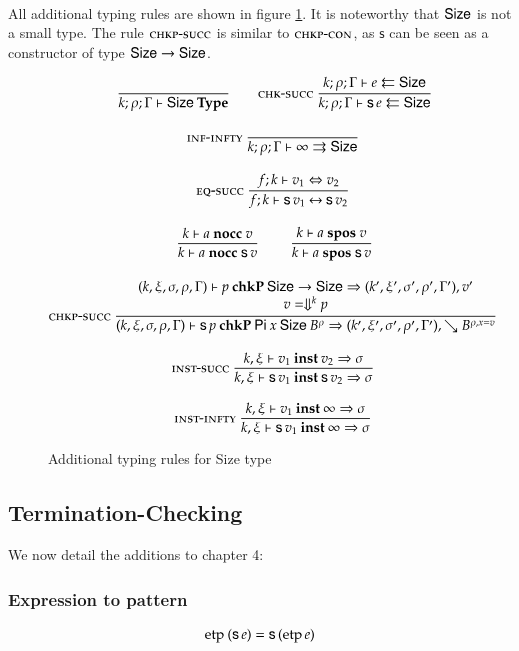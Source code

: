\paragraph*{}
\noindent All additional typing rules are shown in figure \ref{fadd}.
It is noteworthy that $\mathsf{Size}$ is not a small type.
The rule $\mbox{\sc chkp-succ}$ is similar to $\mbox{\sc chkp-con}$, as $\mathsf{s}$ can be seen as a constructor of type $\mathsf{Size} \rightarrow \mathsf{Size}$.
\begin{figure}[htp]
\begin{gather*}
\ \dfrac{}{k;\rho;\Gamma\vdash\mathsf{Size}\:\mathbf{Type}}
\qquad
\mbox{\sc chk-succ}\ \dfrac{k;\rho;\Gamma\vdash e\leftleftarrows\mathsf{Size}}{k;\rho;\Gamma\vdash\mathsf{s}\, e\leftleftarrows\mathsf{Size}} 
\\[2ex]
\mbox{\sc inf-infty}\ \dfrac{}{k;\rho;\Gamma\vdash\infty\rightrightarrows\mathsf{Size}} 
\\[2ex]
\mbox{\sc eq-succ}\ \dfrac{f;k\vdash v_1\Leftrightarrow v_2}{f;k\vdash\mathsf{s}\, v_1{\:\leftrightarrow\:}\mathsf{s}\, v_2}
\\[2ex]
\ \dfrac{k\vdash a\mbox{ \textbf{nocc} }v}{k\vdash a\mbox{ \textbf{nocc} }\mathsf{s}\, v}
\qquad
\ \dfrac{k\vdash a\mbox{ \textbf{spos} }v}{k\vdash a\mbox{ \textbf{spos} }\mathsf{s}\, v}
\\[2ex]
\mbox{\sc chkp-succ}\ \dfrac{\begin{array}[b]{c}
(k,\xi,\sigma,\rho,\Gamma)\vdash p\:\mathbf{chkP}\:\mathsf{Size} \rightarrow \mathsf{Size}\Rightarrow (k',\xi',\sigma',\rho',\Gamma'),v'\\v = \Downarrow^{k}p \end{array}}{
(k,\xi,\sigma,\rho,\Gamma)\vdash\mathsf{s}\, p\:\mathbf{chkP}\:\mathsf{Pi} \: x \: \mathsf{Size} \: B^{\rho}\Rightarrow (k',\xi',\sigma',\rho',\Gamma'),\searrow B^{\rho,x=v}}
\\[2ex]
\mbox{\sc inst-succ}\ \dfrac{k,\xi\vdash v_1\:\mathbf{inst}\:v_2\Rightarrow \sigma}{k,\xi\vdash\mathsf{s}\, v_1\:\mathbf{inst}\:\mathsf{s}\, v_2\Rightarrow \sigma
}
\\[2ex]
\mbox{\sc inst-infty}\ \dfrac{k,\xi\vdash v_1\:\mathbf{inst}\:\infty\Rightarrow \sigma}{k,\xi\vdash\mathsf{s}\, v_1\:\mathbf{inst}\:\infty\Rightarrow \sigma
}
\end{gather*}
\caption{Additional typing rules for Size type}
\label{fadd}
\end{figure}

\subsection{Termination-Checking}

We now detail the additions to chapter 4:

\subsubsection{Expression to pattern}
\[
\begin{array}[t]{ll}
\operatorname{etp} \: (\mathsf{s}\, e) = \mathsf{s}\, (\operatorname{etp} e) \\
\end{array}
\]

